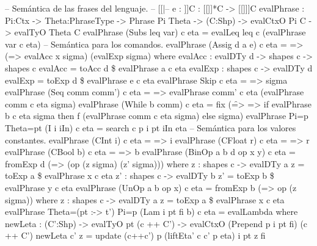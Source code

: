 \begin{code}
-- Semántica de las frases del lenguaje.
-- [[\pi |-- e : \theta]]C : [[\pi]]*C -> [[\theta]]]C
evalPhrase : {Pi:Ctx} -> {Theta:PhraseType} ->
             Phrase Pi Theta -> (C:Shp) -> evalCtxO Pi C -> evalTyO Theta C
evalPhrase (Subs leq var) c eta = evalLeq leq c (evalPhrase var c eta)
-- Semántica para los comandos.
evalPhrase (Assig d a e) c eta = \sigma => (\x => evalAcc x sigma) (evalExp sigma)
    where
        evalAcc : evalDTy d -> shapes c -> shapes c
        evalAcc = toAcc d \$ evalPhrase a c eta
        evalExp : shapes c -> evalDTy d
        evalExp = toExp d \$ evalPhrase e c eta
evalPhrase Skip c eta = \sigma => sigma
evalPhrase (Seq comm comm') c eta = \sigma => evalPhrase comm' c eta (evalPhrase comm c eta sigma)
evalPhrase (While b comm) c eta = fix (\f => \sigma => 
                                            if evalPhrase b c eta sigma 
                                                then f (evalPhrase comm c eta sigma)
                                                else sigma)
evalPhrase {Pi=p} {Theta=pt} (I i iIn) c eta = search c p i pt iIn eta
-- Semántica para los valores constantes.
evalPhrase (CInt i)   c eta = \sigma => i
evalPhrase (CFloat r) c eta = \sigma => r
evalPhrase (CBool b)  c eta = \sigma => b
evalPhrase (BinOp {a} {b} {d} op x y) c eta = fromExp d (\sigma => (op (z sigma) (z' sigma)))
    where z : shapes c -> evalDTy a
          z = toExp a \$ evalPhrase x c eta
          z' : shapes c -> evalDTy b
          z' = toExp b \$ evalPhrase y c eta
evalPhrase (UnOp {a} {b} op x) c eta = fromExp b (\sigma => op (z sigma))
    where
        z : shapes c -> evalDTy a
        z = toExp a \$ evalPhrase x c eta
evalPhrase {Theta=(pt :-> t')} {Pi=p} (Lam i pt fi b) c eta = evalLambda
    where
        newLeta : (C':Shp) -> evalTyO pt (c ++ C') -> evalCtxO (Prepend p i pt fi) (c ++ C')
        newLeta c' z = update (c++c') p (liftEta' c c' p eta) i pt z fi
        

\end{code}
